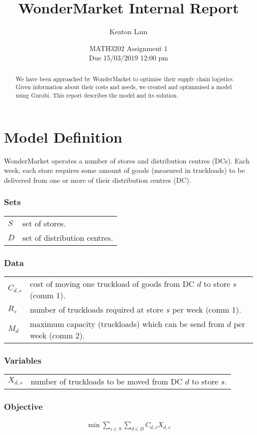 \documentclass[11pt,a4paper]{article}
\author{Kenton Lam}
\date{{MATH3202 Assignment 1 \\ Due 15/03/2019 12:00 pm}}
\title{WonderMarket Internal Report}
\begin{document}
\maketitle
\begin{abstract}
    We have been approached by WonderMarket to optimise their supply chain logistics.
    Given information about their costs and needs, we created and optimmised a model using Gurobi.
    This report describes the model and its solution.
\end{abstract}

\part{Model Definition}
WonderMarket operates a number of stores and distribution centres (DCs).
Each week, each store requires some amount of goods (measured in truckloads)
to be delivered from one or more of their distribution centres (DC).

\section{Sets}
\begin{tabular}{l l}
    $S$ & set of stores. \\ 
    $D$ & set of distribution centres.    
\end{tabular}

\section{Data}
\begin{tabular}{l l}
    $C_{d,s}$ & cost of moving one truckload of goods from DC $d$ to store $s$ (comm 1). \\ 
    $R_s$ & number of truckloads required at store $s$ per week (comm 1). \\
    $M_d$ & maximum capacity (truckloads) which can be send from $d$ per week (comm 2).
\end{tabular}

\section{Variables}
\begin{tabular}{l l}
    $X_{d,s}$ & number of truckloads to be moved from DC $d$ to store $s$.
\end{tabular}

\section{Objective}
\begin{align*}
    \min \sum_{s \in S} \sum_{d \in D} C_{d, s} X_{d,s}
\end{align*}
\end{document}
